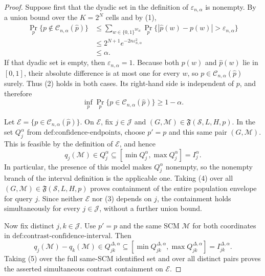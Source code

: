 \documentclass{article}
\begin{document}
\begin{proof}
Suppose first that the dyadic set in the definition of \(\varepsilon_{n,\alpha}\) is nonempty.  By a union bound over the \(K=2^N\) cells and by (1),
\[
\begin{aligned}
\Pr_p\{p\notin\mathcal C_{n,\alpha}(\widehat p)\}
&\le\sum_{w\in\{0,1\}^{\mathcal W_H}}
  \Pr_p\{|\widehat p(w)-p(w)|>\varepsilon_{n,\alpha}\}\\
&\le 2^{N+1}e^{-2n\varepsilon_{n,\alpha}^2}\\
&\le\alpha.
\end{aligned}
\tag{2}
\]
If that dyadic set is empty, then \(\varepsilon_{n,\alpha}=1\).  Because both \(p(w)\) and \(\widehat p(w)\) lie in \([0,1]\), their absolute difference is at most one for every \(w\), so \(p\in\mathcal C_{n,\alpha}(\widehat p)\) surely.  Thus (2) holds in both cases.  Its right-hand side is independent of \(p\), and therefore
\[
\inf_p\Pr_p\{p\in\mathcal C_{n,\alpha}(\widehat p)\}\ge 1-\alpha.
\tag{3}
\]

Let \(\mathcal E=\{p\in\mathcal C_{n,\alpha}(\widehat p)\}\).  On \(\mathcal E\), fix \(j\in\mathcal J\) and \((G,\mathcal M)\in\mathfrak F(\mathcal S,L,H,p)\).  In the set \(Q_j^\alpha\) from \(\text{def:confidence-endpoints}\), choose \(p'=p\) and this same pair \((G,\mathcal M)\).  This is feasible by the definition of \(\mathcal E\), and hence
\[
q_j(\mathcal M)\in Q_j^\alpha\subseteq
[\min Q_j^\alpha,\max Q_j^\alpha]=I_j^\alpha.
\tag{4}
\]
In particular, the presence of this model makes \(Q_j^\alpha\) nonempty, so the nonempty branch of the interval definition is the applicable one.  Taking (4) over all \((G,\mathcal M)\in\mathfrak F(\mathcal S,L,H,p)\) proves containment of the entire population envelope for query \(j\).  Since neither \(\mathcal E\) nor (3) depends on \(j\), the containment holds simultaneously for every \(j\in\mathcal J\), without a further union bound.

Now fix distinct \(j,k\in\mathcal J\).  Use \(p'=p\) and the same SCM \(\mathcal M\) for both coordinates in \(\text{def:contrast-confidence-interval}\).  Then
\[
q_j(\mathcal M)-q_k(\mathcal M)
\in Q_{jk}^{\Delta,\alpha}
\subseteq
[\min Q_{jk}^{\Delta,\alpha},\max Q_{jk}^{\Delta,\alpha}]
=I_{jk}^{\Delta,\alpha}.
\tag{5}
\]
Taking (5) over the full same-SCM identified set and over all distinct pairs proves the asserted simultaneous contrast containment on \(\mathcal E\).


\end{proof}
\end{document}
